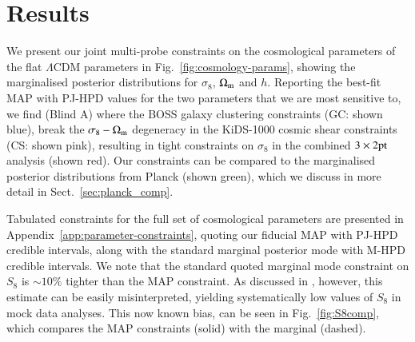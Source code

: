 \section{Results}
\label{sec:results}
We present our joint multi-probe constraints on the cosmological parameters of the flat $\Lambda$CDM parameters in Fig.~\ref{fig:cosmology-params}, showing the marginalised posterior distributions for $\sigma_8$, $\Omega_{\rm m}$ and $h$.   Reporting the best-fit MAP with PJ-HPD values for the two parameters that we are most sensitive to, we find (Blind A)
where the BOSS galaxy clustering constraints (GC: shown blue), break the $\sigma_8-\Omega_{\rm m}$ degeneracy in the KiDS-1000 cosmic shear constraints (CS: shown pink), resulting in tight constraints on $\sigma_8$ in the combined $3\times2{\rm pt}$ analysis (shown red).   Our constraints can be compared to the marginalised posterior distributions from Planck (shown green), which we discuss in more detail in Sect.~\ref{sec:planck_comp}.

Tabulated constraints for the full set of cosmological parameters are presented in Appendix~\ref{app:parameter-constraints}, quoting our fiducial MAP with PJ-HPD credible intervals, along with the standard marginal posterior mode with M-HPD credible intervals.   We note that the standard quoted marginal mode constraint on $S_8$ is $\sim 10\%$ tighter than the MAP constraint.  As discussed in \citet{joachimi/etal:inprep}, however, this estimate can be easily misinterpreted, yielding systematically low values of $S_8$ in mock data analyses.   This now known bias, can be seen in Fig.~\ref{fig:S8comp}, which compares the MAP constraints (solid) with the marginal (dashed).  

